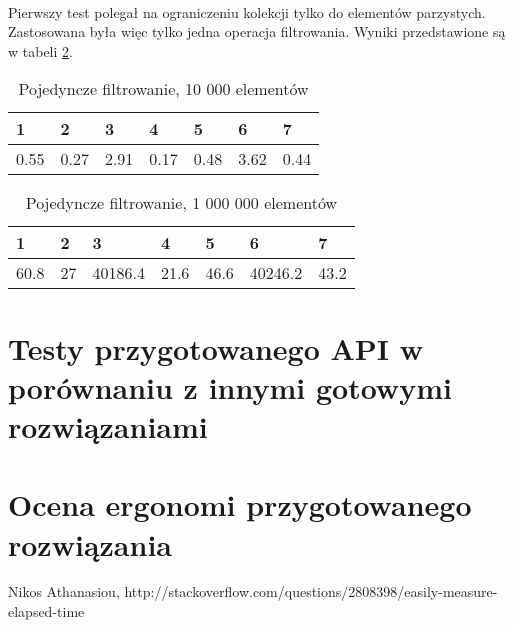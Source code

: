 \documentclass[a4paper,10pt]{report}
\begin{document}
\paragraph{}
Pierwszy test polegał na ograniczeniu kolekcji tylko do elementów parzystych. Zastosowana była więc tylko jedna operacja filtrowania. Wyniki przedstawione są w tabeli \ref{tab1}.
\begin{table}[t]
	\caption{Pojedyncze filtrowanie, 10 000 elementów}
	\label{tab1}
\begin{tabular}{|l|l|l|l|l|l|l|}
	\hline 
	1 & 2 & 3 & 4 & 5 & 6 & 7\\
	\hline
	0.55 & 0.27 & 2.91 & 0.17 & 0.48 & 3.62 & 0.44\\
	\hline
\end{tabular} 
\end{table}

\begin{table}[t]
	\caption{Pojedyncze filtrowanie, 1 000 000 elementów}
	\label{tab1}
	\begin{tabular}{|l|l|l|l|l|l|l|}
		\hline 
		1 & 2 & 3 & 4 & 5 & 6 & 7\\
		\hline
		60.8 & 27 & 40186.4 & 21.6 & 46.6 & 40246.2 & 43.2\\
		\hline
	\end{tabular} 
\end{table}

\section{Testy przygotowanego API w porównaniu z innymi gotowymi rozwiązaniami}
\section{Ocena ergonomi przygotowanego rozwiązania}
\begin{thebibliography}{9}
	
	Nikos Athanasiou,
	http://stackoverflow.com/questions/2808398/easily-measure-elapsed-time

	
\end{thebibliography}
\end{document}
